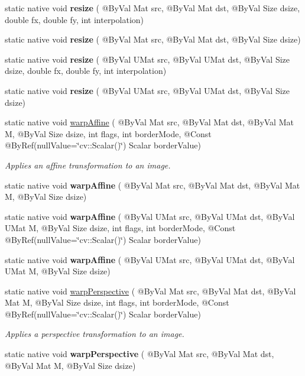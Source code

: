 \begin{DoxyCompactItemize}
\item 
static native void {\bfseries resize} ( @By\+Val Mat src, @By\+Val Mat dst, @By\+Val Size dsize, double fx, double fy, int interpolation)
\item 
static native void {\bfseries resize} ( @By\+Val Mat src, @By\+Val Mat dst, @By\+Val Size dsize)
\item 
static native void {\bfseries resize} ( @By\+Val U\+Mat src, @By\+Val U\+Mat dst, @By\+Val Size dsize, double fx, double fy, int interpolation)
\item 
static native void {\bfseries resize} ( @By\+Val U\+Mat src, @By\+Val U\+Mat dst, @By\+Val Size dsize)
\item 
static native void \hyperlink{group__imgproc__transform_ga0f7c28988998c3ae473a6708bdeef114}{warp\+Affine} ( @By\+Val Mat src, @By\+Val Mat dst, @By\+Val Mat M, @By\+Val Size dsize, int flags, int border\+Mode, @Const @By\+Ref(null\+Value=\char`\"{}cv\+::\+Scalar()\char`\"{}) Scalar border\+Value)
\begin{DoxyCompactList}\small\item\em Applies an affine transformation to an image. \end{DoxyCompactList}\item 
static native void {\bfseries warp\+Affine} ( @By\+Val Mat src, @By\+Val Mat dst, @By\+Val Mat M, @By\+Val Size dsize)
\item 
static native void {\bfseries warp\+Affine} ( @By\+Val U\+Mat src, @By\+Val U\+Mat dst, @By\+Val U\+Mat M, @By\+Val Size dsize, int flags, int border\+Mode, @Const @By\+Ref(null\+Value=\char`\"{}cv\+::\+Scalar()\char`\"{}) Scalar border\+Value)
\item 
static native void {\bfseries warp\+Affine} ( @By\+Val U\+Mat src, @By\+Val U\+Mat dst, @By\+Val U\+Mat M, @By\+Val Size dsize)
\item 
static native void \hyperlink{group__imgproc__transform_ga75e1d893d7bf652cd99d608259c00c24}{warp\+Perspective} ( @By\+Val Mat src, @By\+Val Mat dst, @By\+Val Mat M, @By\+Val Size dsize, int flags, int border\+Mode, @Const @By\+Ref(null\+Value=\char`\"{}cv\+::\+Scalar()\char`\"{}) Scalar border\+Value)
\begin{DoxyCompactList}\small\item\em Applies a perspective transformation to an image. \end{DoxyCompactList}\item 
static native void {\bfseries warp\+Perspective} ( @By\+Val Mat src, @By\+Val Mat dst, @By\+Val Mat M, @By\+Val Size dsize)

\end{DoxyCompactItemize}
